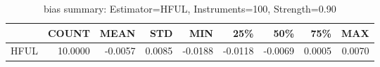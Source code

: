 \begin{table}[ht]
\centering
\caption{bias summary: Estimator=HFUL, Instruments=100, Strength=0.90}
\begin{tabular}{lrrrrrrrr}
\toprule
 & COUNT & MEAN & STD & MIN & 25\% & 50\% & 75\% & MAX \\
\midrule
HFUL & 10.0000 & -0.0057 & 0.0085 & -0.0188 & -0.0118 & -0.0069 & 0.0005 & 0.0070 \\
\bottomrule
\end{tabular}
\end{table}
